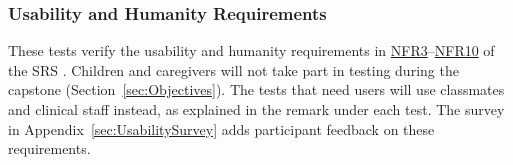 \documentclass[10pt,titlepage]{article}
\newcommand{\srsurl}{https://team-hindsight.github.io/ophthamology-game/SRS/SRS.pdf}
\newcommand{\srsnfrref}[2]{\href{\srsurl\#nameddest=#1}{NFR#2}}
\begin{document}

\subsubsection{Usability and Humanity Requirements}
\label{sec:UsabilityHumanityNFRTests}

These tests verify the usability and humanity requirements in
\srsnfrref{NFR_TouchTarget}{3}--\srsnfrref{NFR_Colour}{10} of the SRS
\cite{SRS}. Children and caregivers will not take part in testing during the
capstone (Section~\ref{sec:Objectives}). The tests that need users will use
classmates and clinical staff instead, as explained in the remark under each
test. The survey in Appendix~\ref{sec:UsabilitySurvey} adds participant feedback
on these requirements.
\end{document}
